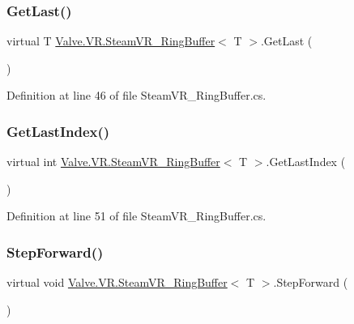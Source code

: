 \subsubsection{\texorpdfstring{GetLast()}{GetLast()}}
{\footnotesize\ttfamily virtual T \mbox{\hyperlink{class_valve_1_1_v_r_1_1_steam_v_r___ring_buffer}{Valve.\+V\+R.\+Steam\+V\+R\+\_\+\+Ring\+Buffer}}$<$ T $>$.Get\+Last (\begin{DoxyParamCaption}{ }\end{DoxyParamCaption})\hspace{0.3cm}{\ttfamily [virtual]}}



Definition at line 46 of file Steam\+V\+R\+\_\+\+Ring\+Buffer.\+cs.

\mbox{\label{class_valve_1_1_v_r_1_1_steam_v_r___ring_buffer_a33fbb3e137538cd6ff1731d4df99691a}} 
\subsubsection{\texorpdfstring{GetLastIndex()}{GetLastIndex()}}
{\footnotesize\ttfamily virtual int \mbox{\hyperlink{class_valve_1_1_v_r_1_1_steam_v_r___ring_buffer}{Valve.\+V\+R.\+Steam\+V\+R\+\_\+\+Ring\+Buffer}}$<$ T $>$.Get\+Last\+Index (\begin{DoxyParamCaption}{ }\end{DoxyParamCaption})\hspace{0.3cm}{\ttfamily [virtual]}}



Definition at line 51 of file Steam\+V\+R\+\_\+\+Ring\+Buffer.\+cs.

\mbox{\label{class_valve_1_1_v_r_1_1_steam_v_r___ring_buffer_a28bb53437d7a8a6071c2f142b336a699}} 
\subsubsection{\texorpdfstring{StepForward()}{StepForward()}}
{\footnotesize\ttfamily virtual void \mbox{\hyperlink{class_valve_1_1_v_r_1_1_steam_v_r___ring_buffer}{Valve.\+V\+R.\+Steam\+V\+R\+\_\+\+Ring\+Buffer}}$<$ T $>$.Step\+Forward (\begin{DoxyParamCaption}{ }\end{DoxyParamCaption})\hspace{0.3cm}{\ttfamily [virtual]}}



